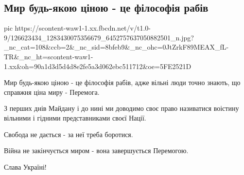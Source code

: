  
 
 
 
 
 
\subsection{Мир будь-якою ціною - це філософія рабів}
\label{sec:21_11_2020.fb.kotsubajlo_dmytro.1.myr_raby}

\ifcmt
pic https://scontent-waw1-1.xx.fbcdn.net/v/t1.0-9/126623434_1283430075356679_6452757637050882501_n.jpg?_nc_cat=108&ccb=2&_nc_sid=8bfeb9&_nc_ohc=0JtZrkF89MEAX_fL-TR&_nc_ht=scontent-waw1-1.xx&oh=90a1d3d5d4d8e2fe5a3d062ebc511712&oe=5FE2521D
\fi

Мир будь-якою ціною - це філософія рабів, адже вільні люди точно знають, що
справжня ціна миру - Перемога.

З перших днів Майдану і до нині ми доводимо своє право називатися воістину
вільними і гідними представниками своєї Нації.

Свобода не дається - за неї треба боротися.

Війна не закінчується миром - вона завершується Перемогою.

Слава Україні!
